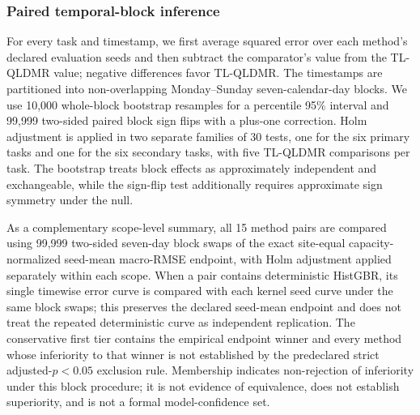 \subsubsection{Paired temporal-block inference}
{\color{blue}For every task and timestamp, we first average squared error over each method's declared evaluation seeds and then subtract the comparator's value from the TL-QLDMR value; negative differences favor TL-QLDMR. The timestamps are partitioned into non-overlapping Monday--Sunday seven-calendar-day blocks. We use 10,000 whole-block bootstrap resamples for a percentile 95\% interval and 99,999 two-sided paired block sign flips with a plus-one correction. Holm adjustment is applied in two separate families of 30 tests, one for the six primary tasks and one for the six secondary tasks, with five TL-QLDMR comparisons per task. The bootstrap treats block effects as approximately independent and exchangeable, while the sign-flip test additionally requires approximate sign symmetry under the null.}

{\color{blue}As a complementary scope-level summary, all 15 method pairs are compared using 99,999 two-sided seven-day block swaps of the exact site-equal capacity-normalized seed-mean macro-RMSE endpoint, with Holm adjustment applied separately within each scope. When a pair contains deterministic HistGBR, its single timewise error curve is compared with each kernel seed curve under the same block swaps; this preserves the declared seed-mean endpoint and does not treat the repeated deterministic curve as independent replication. The conservative first tier contains the empirical endpoint winner and every method whose inferiority to that winner is not established by the predeclared strict adjusted-$p<0.05$ exclusion rule. Membership indicates non-rejection of inferiority under this block procedure; it is not evidence of equivalence, does not establish superiority, and is not a formal model-confidence set.}

